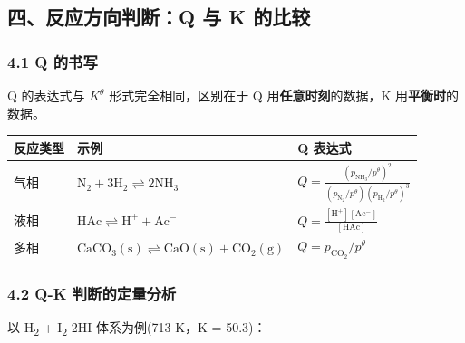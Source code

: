 \subsection{四、反应方向判断：Q 与 K 的比较}\label{ux56dbux53cdux5e94ux65b9ux5411ux5224ux65adq-ux4e0e-k-ux7684ux6bd4ux8f83}

\subsubsection{4.1 Q 的书写}\label{q-ux7684ux4e66ux5199}

Q 的表达式与 \(K^\theta\) 形式完全相同，区别在于 Q 用\textbf{任意时刻}的数据，K 用\textbf{平衡时}的数据。

{\def\LTcaptype{none} %
\begin{longtable}[]{@{}
  >{\raggedright\arraybackslash}p{}
  >{\raggedright\arraybackslash}p{}
  >{\raggedright\arraybackslash}p{}@{}}
\toprule\noalign{}
\begin{minipage}[b]{\linewidth}\raggedright
反应类型
\end{minipage} & \begin{minipage}[b]{\linewidth}\raggedright
示例
\end{minipage} & \begin{minipage}[b]{\linewidth}\raggedright
Q 表达式
\end{minipage} \\
\midrule\noalign{}
\endhead
\bottomrule\noalign{}
\endlastfoot
气相 & \(\mathrm{N_2 + 3H_2 \rightleftharpoons 2NH_3}\) & \(Q = \frac{(p_{\mathrm{NH_3}}/p^\theta)^2}{(p_{\mathrm{N_2}}/p^\theta)(p_{\mathrm{H_2}}/p^\theta)^3}\) \\
液相 & \(\mathrm{HAc \rightleftharpoons H^+ + Ac^-}\) & \(Q = \frac{[\mathrm{H^+}][\mathrm{Ac^-}]}{[\mathrm{HAc}]}\) \\
多相 & \(\mathrm{CaCO_3(s) \rightleftharpoons CaO(s) + CO_2(g)}\) & \(Q = p_{\mathrm{CO_2}}/p^\theta\) \\
\end{longtable}
}

\subsubsection{4.2 Q-K 判断的定量分析}\label{q-k-ux5224ux65adux7684ux5b9aux91cfux5206ux6790}

以 H\textsubscript{2} + I\textsubscript{2} \衡 2HI 体系为例(713 K，K = 50.3)：

